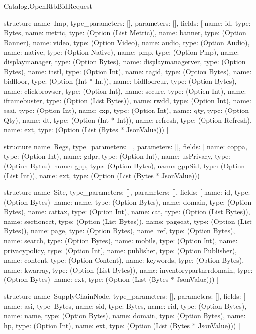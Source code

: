 \begin{lexlean}{Catalog.OpenRtbBidRequest}
\begin{semanticmodule}
structure{
  name: Imp,
  type_parameters: [],
  parameters: [],
  fields: [
    {name: id, type: Bytes},
    {name: metric, type: (Option (List Metric))},
    {name: banner, type: (Option Banner)},
    {name: video, type: (Option Video)},
    {name: audio, type: (Option Audio)},
    {name: native, type: (Option Native)},
    {name: pmp, type: (Option Pmp)},
    {name: displaymanager, type: (Option Bytes)},
    {name: displaymanagerver, type: (Option Bytes)},
    {name: instl, type: (Option Int)},
    {name: tagid, type: (Option Bytes)},
    {name: bidfloor, type: (Option (Int * Int))},
    {name: bidfloorcur, type: (Option Bytes)},
    {name: clickbrowser, type: (Option Int)},
    {name: secure, type: (Option Int)},
    {name: iframebuster, type: (Option (List Bytes))},
    {name: rwdd, type: (Option Int)},
    {name: ssai, type: (Option Int)},
    {name: exp, type: (Option Int)},
    {name: qty, type: (Option Qty)},
    {name: dt, type: (Option (Int * Int))},
    {name: refresh, type: (Option Refresh)},
    {name: ext, type: (Option (List (Bytes * JsonValue)))}
  ]
}

structure{
  name: Regs,
  type_parameters: [],
  parameters: [],
  fields: [
    {name: coppa, type: (Option Int)},
    {name: gdpr, type: (Option Int)},
    {name: usPrivacy, type: (Option Bytes)},
    {name: gpp, type: (Option Bytes)},
    {name: gppSid, type: (Option (List Int))},
    {name: ext, type: (Option (List (Bytes * JsonValue)))}
  ]
}

structure{
  name: Site,
  type_parameters: [],
  parameters: [],
  fields: [
    {name: id, type: (Option Bytes)},
    {name: name, type: (Option Bytes)},
    {name: domain, type: (Option Bytes)},
    {name: cattax, type: (Option Int)},
    {name: cat, type: (Option (List Bytes))},
    {name: sectioncat, type: (Option (List Bytes))},
    {name: pagecat, type: (Option (List Bytes))},
    {name: page, type: (Option Bytes)},
    {name: ref, type: (Option Bytes)},
    {name: search, type: (Option Bytes)},
    {name: mobile, type: (Option Int)},
    {name: privacypolicy, type: (Option Int)},
    {name: publisher, type: (Option Publisher)},
    {name: content, type: (Option Content)},
    {name: keywords, type: (Option Bytes)},
    {name: kwarray, type: (Option (List Bytes))},
    {name: inventorypartnerdomain, type: (Option Bytes)},
    {name: ext, type: (Option (List (Bytes * JsonValue)))}
  ]
}

structure{
  name: SupplyChainNode,
  type_parameters: [],
  parameters: [],
  fields: [
    {name: asi, type: Bytes},
    {name: sid, type: Bytes},
    {name: rid, type: (Option Bytes)},
    {name: name, type: (Option Bytes)},
    {name: domain, type: (Option Bytes)},
    {name: hp, type: (Option Int)},
    {name: ext, type: (Option (List (Bytes * JsonValue)))}
  ]
}


\end{semanticmodule}
\end{lexlean}
